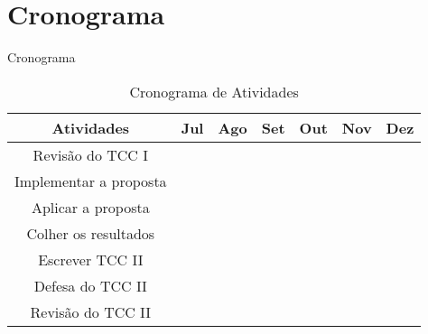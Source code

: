 

\section{Cronograma}
    \label{sec:cronograma}
    
    \begin{frame}{Cronograma}
        \begin{table}[h]
        \caption*{Cronograma de Atividades}
        \centering
        \begin{tabular}{c c c c c c c} \hline
            \label{tab:cronograma-atividades}
            \textbf{Atividades} & \textbf{Jul} & \textbf{Ago} & \textbf{Set} & \textbf{Out} & \textbf{Nov} & \textbf{Dez} \\ \hline
            Revisão do TCC I        &   &   &   &   &   &   \\
            Implementar a proposta  &   &   &   &   &   &   \\
            Aplicar a proposta      &   &   &   &   &   &   \\
            Colher os resultados    &   &   &   &   &   &   \\
            Escrever TCC II         &   &   &   &   &   &   \\
            Defesa do TCC II        &   &   &   &   &   &   \\
            Revisão do TCC II       &   &   &   &   &   &   \\ \hline
        \end{tabular}
    \end{table}
    \end{frame}